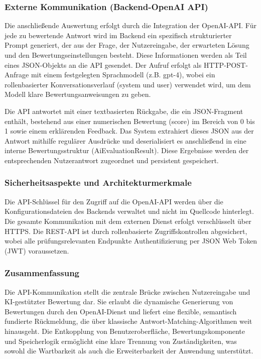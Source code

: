\documentclass[a4paper,12pt]{article}
\begin{document}
\subsubsection{Externe Kommunikation (Backend-OpenAI API)}
Die anschließende Auswertung erfolgt durch die Integration der OpenAI-API. Für jede zu bewertende Antwort wird im Backend ein spezifisch strukturierter Prompt generiert, der aus der Frage, der Nutzereingabe, der erwarteten Lösung und den Bewertungseinstellungen besteht. Diese Informationen werden als Teil eines JSON-Objekts an die API gesendet. Der Aufruf erfolgt als HTTP-POST-Anfrage mit einem festgelegten Sprachmodell (z.B. gpt-4), wobei ein rollenbasierter Konversationsverlauf (system und user) verwendet wird, um dem Modell klare Bewertungsanweisungen zu geben.

Die API antwortet mit einer textbasierten Rückgabe, die ein JSON-Fragment enthält, bestehend aus einer numerischen Bewertung (score) im Bereich von 0 bis 1 sowie einem erklärenden Feedback. Das System extrahiert dieses JSON aus der Antwort mithilfe regulärer Ausdrücke und deserialisiert es anschließend in eine interne Bewertungsstruktur (AiEvaluationResult). Diese Ergebnisse werden der entsprechenden Nutzerantwort zugeordnet und persistent gespeichert.

\subsubsection{Sicherheitsaspekte und Architekturmerkmale}
Die API-Schlüssel für den Zugriff auf die OpenAI-API werden über die Konfigurationsdateien des Backends verwaltet und nicht im Quellcode hinterlegt. Die gesamte Kommunikation mit dem externen Dienst erfolgt verschlüsselt über HTTPS. Die REST-API ist durch rollenbasierte Zugriffskontrollen abgesichert, wobei alle prüfungsrelevanten Endpunkte Authentifizierung per JSON Web Token (JWT) voraussetzen.

\subsubsection{Zusammenfassung}
Die API-Kommunikation stellt die zentrale Brücke zwischen Nutzereingabe und KI-gestützter Bewertung dar. Sie erlaubt die dynamische Generierung von Bewertungen durch den OpenAI-Dienst und liefert eine flexible, semantisch fundierte Rückmeldung, die über klassische Antwort-Matching-Algorithmen weit hinausgeht. Die Entkopplung von Benutzeroberfläche, Bewertungskomponente und Speicherlogik ermöglicht eine klare Trennung von Zuständigkeiten, was sowohl die Wartbarkeit als auch die Erweiterbarkeit der Anwendung unterstützt.
\end{document}
